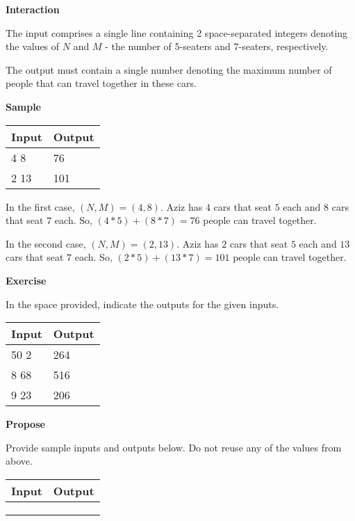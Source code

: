 \documentclass[a4paper]{exam}
\newcommand\heading[1]{\textbf{#1}}
\begin{document}
\begin{questions}
    \heading{Interaction}

    The input comprises a single line containing 2 space-separated integers denoting the values of $N$ and $M$ - the number of 5-seaters and 7-seaters, respectively.

    The output must contain a single number denoting the maximum number of people that can travel together in these cars.

    \heading{Sample}

    \begin{tabularx}{\textwidth}{|X|X|}
        \rowcolor{gray!50}
        \hline
        Input & Output \\ \hline\hline
        4 8   & 76     \\\hline
        2 13  & 101    \\\hline
    \end{tabularx}

    In the first case, $(N,M)=(4,8)$. Aziz has $4$ cars that seat $5$ each and $8$ cars that seat $7$ each. So, $(4*5)+(8*7)=76$ people can travel together.

    In the second case, $(N,M)=(2,13)$. Aziz has $2$ cars that seat $5$ each and $13$ cars that seat $7$ each. So, $(2*5)+(13*7)=101$ people can travel together.

    \heading{Exercise}

    In the space provided, indicate the outputs for the given inputs.

    \begin{tabularx}{\textwidth}{|X|X|}
        \rowcolor{gray!50}
        \hline
        Input & Output \\ \hline\hline
        50 2  & 264    \\\hline
        8 68  & 516    \\\hline
        9 23  & 206    \\\hline
    \end{tabularx}

    \heading{Propose}

    Provide sample inputs and outputs below. Do not reuse any of the values from above.

    \begin{tabularx}{\textwidth}{|X|X|}
        \rowcolor{gray!50}
        \hline
        Input & Output \\ \hline\hline
              &        \\\hline
              &        \\\hline
              &        \\\hline
    \end{tabularx}


\end{questions}
\end{document}
